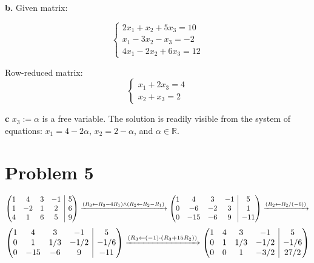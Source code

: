 \documentclass{article}
\makeatletter
\newenvironment{amatrix}[1]{\left(\begin{array}{@{}*{#1}{c}|c@{}}}{\end{array}\right)}
\makeatother
\begin{document}
\textbf{b.} Given matrix:

\begin{equation*}
  \begin{cases}
    2x_{1} + x_{2} + 5x_{3} = 10 \\
    x_{1} -3x_{2} - x_{3} = -2 \\
    4x_{1} - 2x_{2} + 6x_{3} = 12
  \end{cases}
\end{equation*}

Row-reduced matrix:
\begin{equation*}
  \begin{cases}
    x_{1} + 2x_{3} = 4 \\
    x_{2} + x_{3} = 2
  \end{cases}
\end{equation*}

\textbf{c} $x_{3} := \alpha$ is a free variable. The solution is readily visible from the system of equations: $x_{1} = 4 - 2\alpha$, $x_{2} = 2 - \alpha$, and $\alpha \in \mathbb{R}$.

\section{Problem 5}

\begin{equation*}
  \begin{amatrix}{4}
    1 & 4 & 3 & -1 & 5 \\
    1 & -2 & 1 & 2 & 6 \\
    4 & 1 & 6 & 5 & 9
  \end{amatrix}
  \xrightarrow{(R_{3} \leftarrow R_{3} - 4R_{1} ) \land ( R_{2} \leftarrow R_{2} - R_{1} )}  
  \begin{amatrix}{4}
    1 & 4 & 3 & -1 & 5 \\
    0 & -6 & -2 & 3 & 1 \\
    0 & -15 & -6 & 9 & -11
  \end{amatrix}
  \xrightarrow{( R_{2} \leftarrow R_{2} / (-6) )}
\end{equation*}
\begin{equation*}
  \begin{amatrix}{4}
    1 & 4 & 3 & -1 & 5 \\
    0 & 1 & 1/3 & -1/2 & -1/6 \\
    0 & -15 & -6 & 9 & -11
  \end{amatrix}
  \xrightarrow{( R_{3} \leftarrow (-1) \cdot (R_{3} + 15R_{2}) )}
  \begin{amatrix}{4}
    1 & 4 & 3 & -1 & 5 \\
    0 & 1 & 1/3 & -1/2 & -1/6 \\
    0 & 0 & 1  & -3/2 & 27/2
  \end{amatrix}
\end{equation*}
\end{document}
